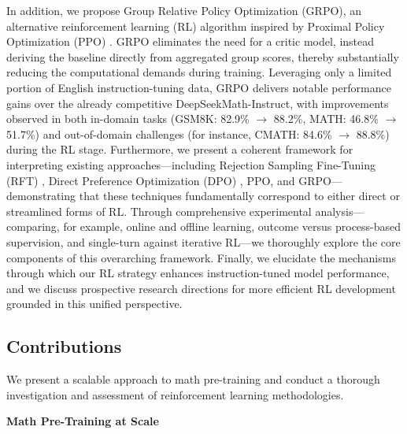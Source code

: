 In addition, we propose Group Relative Policy Optimization (GRPO), an alternative reinforcement learning (RL) algorithm inspired by Proximal Policy Optimization (PPO) \citep{schulman2017proximal}. GRPO eliminates the need for a critic model, instead deriving the baseline directly from aggregated group scores, thereby substantially reducing the computational demands during training. Leveraging only a limited portion of English instruction-tuning data, GRPO delivers notable performance gains over the already competitive DeepSeekMath-Instruct, with improvements observed in both in-domain tasks (GSM8K: 82.9\% $\rightarrow$ 88.2\%, MATH: 46.8\% $\rightarrow$ 51.7\%) and out-of-domain challenges (for instance, CMATH: 84.6\% $\rightarrow$ 88.8\%) during the RL stage. Furthermore, we present a coherent framework for interpreting existing approaches—including Rejection Sampling Fine-Tuning (RFT) \citep{yuan2023scaling}, Direct Preference Optimization (DPO) \citep{dpo}, PPO, and GRPO—demonstrating that these techniques fundamentally correspond to either direct or streamlined forms of RL. Through comprehensive experimental analysis—comparing, for example, online and offline learning, outcome versus process-based supervision, and single-turn against iterative RL—we thoroughly explore the core components of this overarching framework. Finally, we elucidate the mechanisms through which our RL strategy enhances instruction-tuned model performance, and we discuss prospective research directions for more efficient RL development grounded in this unified perspective.

\subsection{Contributions}
We present a scalable approach to math pre-training and conduct a thorough investigation and assessment of reinforcement learning methodologies.

\textbf{Math Pre-Training at Scale}

